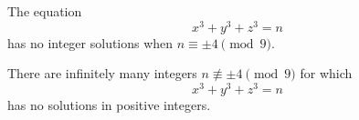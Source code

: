 \begin{proposition}
    The equation
\[
    x^3+y^3+z^3=n
\]
    has no integer solutions when $n\equiv\pm4\pmod9$.
\end{proposition}

\begin{proposition}
    There are infinitely many integers $n\not\equiv\pm4\pmod9$ for which
\[
    x^3+y^3+z^3=n
\]
    has no solutions in positive integers.
\end{proposition}
